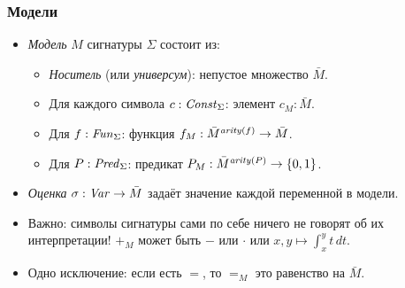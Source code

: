 \documentclass[10pt]{beamer}
\begin{document}
\begin{frame}
    \frametitle{Модели}
    \begin{itemize}
        \item \emph{Модель} $M$ сигнатуры $\Sigma$ состоит из:
        \begin{itemize}
            \item \emph{Носитель} (или \emph{универсум}): \pause непустое множество $\bar{M}$.
            \item Для каждого символа $c : \mathit{Const}_\Sigma$: \pause элемент $c_M : \bar{M}$.
            \item Для $f: \mathit{Fun}_\Sigma$: \pause функция $f_M: \bar{M}^{\mathit{arity}(f)} \to \bar{M}$.
            \item Для $P: \mathit{Pred}_\Sigma$: \pause предикат $P_M: \bar{M}^{\mathit{arity}(P)} \to \{0,1\}$.
        \end{itemize}
        \item \emph{Оценка} $\sigma : \mathit{Var} \to \bar{M}$ задаёт значение каждой переменной в модели.
        \item Важно: символы сигнатуры сами по себе ничего не говорят об их интерпретации! $+_M$ может быть $-$ или $\cdot$ или $x,y \mapsto \int_{x}^{y} t\,dt$.
        \pause 
        \item Одно исключение: если есть $=$, то $=_M$ это равенство на $\bar{M}$.
    \end{itemize}
\end{frame}
\end{document}
